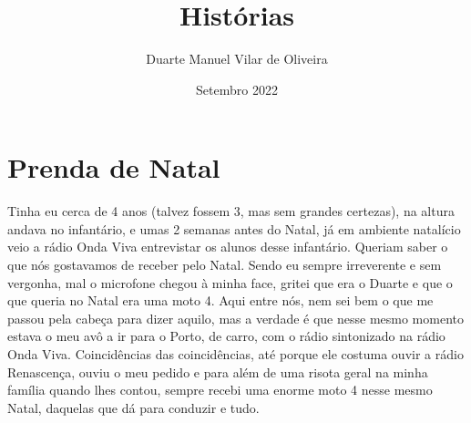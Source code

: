 \documentclass{article}
\title{Histórias}
\author{Duarte Manuel Vilar de Oliveira }
\date{Setembro  2022}
\begin{document}
\maketitle
\chapter{Prenda de Natal}
Tinha eu cerca de 4 anos (talvez fossem 3, mas sem grandes certezas), na altura andava no infantário, e umas 2 semanas antes do Natal, já em ambiente natalício
veio a rádio Onda Viva entrevistar os alunos desse infantário. Queriam saber o que nós gostavamos de receber pelo Natal.
Sendo eu sempre irreverente e sem vergonha, mal o microfone chegou à minha face, gritei que era o Duarte e que o que queria no Natal era uma moto 4. 
Aqui entre nós, nem sei bem o que me passou pela cabeça para dizer aquilo, mas a verdade é que nesse mesmo momento estava o meu avô a ir para o Porto, de carro, com o rádio sintonizado na rádio Onda Viva.
Coincidências das coincidências, até porque ele costuma ouvir a rádio Renascença, ouviu o meu pedido e para além de uma risota geral na minha família quando lhes contou, sempre recebi uma enorme moto 4 nesse mesmo Natal, daquelas que dá para conduzir e tudo.  
\end{document}
